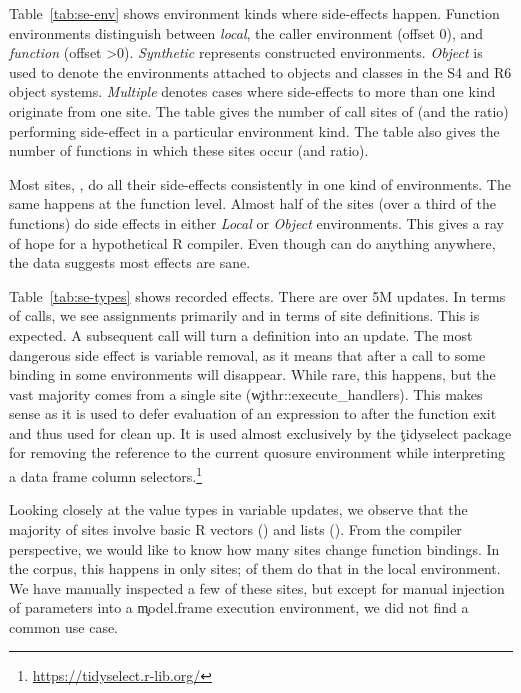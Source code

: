 \documentclass[review,screen,acmsmall,anonymous=true]{acmart}
\begin{document}
Table~\ref{tab:se-env} shows environment kinds where side-effects happen.
Function environments distinguish between \emph{local}, the caller environment
(offset 0), and \emph{function} (offset >0). \emph{Synthetic} represents
constructed environments. \emph{Object} is used to denote the environments
attached to objects and classes in the S4 and R6 object systems. \emph{Multiple}
denotes cases where side-effects to more than one kind originate from one site.
The table gives the number of call sites of \eval (and the ratio) performing
side-effect in a particular environment kind. The table also gives the number of
functions in which these sites occur (and ratio).

Most sites, \SESitesInOneClass, do all their side-effects consistently in one
kind of environments. The same happens at the function level. Almost half of the
sites (over a third of the functions) do side effects in either \emph{Local} or
\emph{Object} environments. This gives a ray of hope for a hypothetical R
compiler. Even though \eval can do anything anywhere, the data suggests most
effects are sane.

Table~\ref{tab:se-types} shows recorded effects. There are over 5M updates. In
terms of calls, we see assignments primarily and in terms of site definitions.
This is expected. A subsequent \eval call will turn a definition into an update.
The most dangerous side effect is variable removal, as it means that after a
call to \eval some binding in some environments will disappear. While rare, this
happens, but the vast majority comes from a single site
(\c{withr::execute\_handlers}). This makes sense as it is used to defer
evaluation of an expression to after the function exit and thus used for clean
up. It is used almost exclusively by the \c{tidyselect} package for removing the
reference to the current quosure environment while interpreting a data frame
column selectors.\footnote{\cf \url{https://tidyselect.r-lib.org/}}

Looking closely at the value types in variable updates, we observe that the
majority of \eval sites involve basic R vectors (\SEBasicTypeRatio) and lists
(\SEListTypeRatio). From the compiler perspective, we would like to know how
many sites change function bindings. In the corpus, this happens in only
\SEClosureType sites; \SEClosureTypeLocal of them do that in the local
environment. We have manually inspected a few of these sites, but except for
manual injection of parameters into a \c{model.frame} execution environment, we
did not find a common use case.
\end{document}
